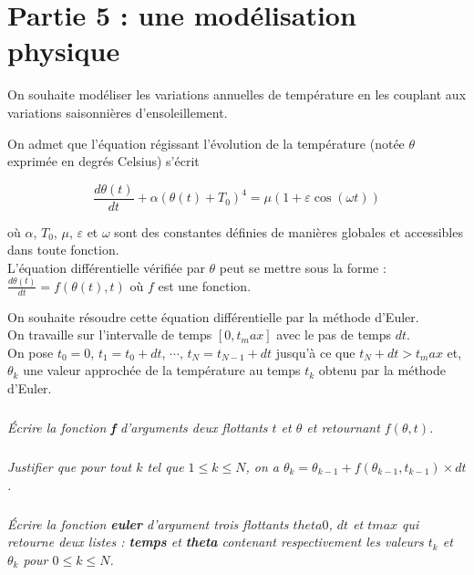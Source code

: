 \documentclass[10pt,fleqn]{article} %
\begin{document}
\section*{Partie 5 : une modélisation physique}

On souhaite modéliser les variations annuelles de 
température en les couplant aux variations saisonnières d'ensoleillement.

On admet que l'équation régissant l'évolution de la température (notée $\theta$ exprimée
en degrés Celsius) s'écrit

$$	\frac{d\theta(t)}{dt} + \alpha\left( \theta(t)+T_0\right)^4 = \mu\left(1 + \varepsilon
\cos(\omega t)\right)	$$

où $\alpha$, $T_0$, $\mu$, $\varepsilon$ et $\omega$ sont des constantes définies de manières 
globales et accessibles dans toute fonction.\\

L'équation différentielle vérifiée par $\theta$ peut se mettre sous la forme :
$\frac{d\theta(t)}{dt} =f(\theta(t),t)$ où $f$ est une fonction.

On souhaite résoudre cette équation différentielle par la méthode d'Euler.\\
On travaille sur l'intervalle de temps $[0,t_max]$ avec le pas de temps $d t$.\\
On pose $t_0=0$, $t_1=t_0+dt$, $\cdots$, $t_N=t_{N-1}+dt$ jusqu'à ce que $t_N+dt>t_max$
et, $\theta_k$ une valeur approchée de la température au temps $t_k$ obtenu par la méthode d'Euler.\\

\subparagraph{}
\textit{Écrire la  fonction \textbf{f} d'arguments deux flottants $t$ et $\theta$ et retournant 
$f(\theta,t)$.}

\ifprof
\begin{corrige}
\end{corrige}
\else
\fi

\subparagraph{} 
\textit{Justifier que pour tout $k$ tel que $1 \leq k \leq N$, on a 
$\theta_{k}=\theta_{k-1}+f(\theta_{k-1},t_{k-1}) \times dt$.}

\subparagraph{} 
\textit{Écrire la fonction \textbf{euler} d'argument trois flottants $theta0$, $dt$ et $tmax$ qui retourne 
deux listes : \textbf{temps} et \textbf{theta} contenant respectivement les valeurs 
$t_k$ et $\theta_k$ pour $0\leq k \leq N$.}
\end{document}

